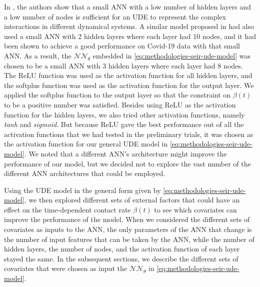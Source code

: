In \cite{rackauckasUniversalDifferentialEquations2020}, the authors show that a small \gls{ANN} with a low number of hidden layers and a low number of nodes is sufficient for an \gls{UDE} to represent the complex interactions in different dynamical systems.
A similar model proposed in \cite{dandekarMachineLearningAidedGlobal2020a} had also used a small \gls{ANN} with 2 hidden layers where each layer had 10 nodes, and it had been shown to achieve a good performance on Covid-19 data with that small \gls{ANN}.
As a result, the $\mathcal{NN}_\theta$ embedded in \autoref{eq:methodologies-seir-ude-model} was chosen to be a small \gls{ANN} with 3 hidden layers where each layer had 8 nodes.
The \gls{ReLU} function was used as the activation function for all hidden layers, and the softplus function was used as the activation function for the output layer.
We applied the softplus function to the output layer so that the constraint on $\beta(t)$ to be a positive number was satisfied.
Besides using \gls{ReLU} as the activation function for the hidden layers, we also tried other activation functions, namely \textit{tanh} and \textit{sigmoid}.
But because \gls{ReLU} gave the best performance out of all the activation functions that we had tested in the preliminary trials, it was chosen as the activation function for our general \gls{UDE} model in \autoref{eq:methodologies-seir-ude-model}.
We noted that a different \gls{ANN}'s architecture might improve the performance of our model, but we decided not to explore the vast number of the different \gls{ANN} architectures that could be employed.

Using the \gls{UDE} model in the general form given by \autoref{eq:methodologies-seir-ude-model}, we then explored different sets of external factors that could have an effect on the time-dependent contact rate $\beta (t)$ to see which covariates can improve the performance of the model.
When we considered the different sets of covariates as inputs to the \gls{ANN}, the only parameters of the \gls{ANN} that change is the number of input features that can be taken by the \gls{ANN}, while the number of hidden layers, the number of nodes, and the activation function of each layer stayed the same.
In the subsequent sections, we describe the different sets of covariates that were chosen as input the $\mathcal{NN}_\theta$ in \autoref{eq:methodologies-seir-ude-model}.

